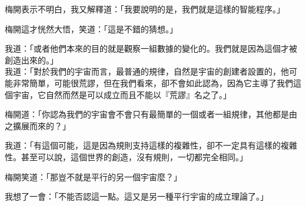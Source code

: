 梅開表示不明白，我又解釋道：「我要說明的是，我們就是這樣的智能程序。」

梅開這才恍然大悟，笑道：「這是不錯的猜想。」

我道：「或者他們本來的目的就是觀察一組數據的變化的。我們就是因為這個才被創造出來的。」
\\


我道：「對於我們的宇宙而言，最普通的規律，自然是宇宙的創建者設置的，他可能非常簡單，可能很荒謬，但在我們看來，卻不會如此認為，因為它主導了我們這個宇宙，它自然而然是可以成立而且不能以『荒謬』名之了。」

梅開道：「你認為我們的宇宙會不會只有最簡單的一個或者一組規律，其他都是由之擴展而來的？」

我道：「有這個可能，這是因為規則支持這樣的複雜性，卻不一定具有這樣的複雜性。甚至可以說，這個世界的創造，沒有規則，一切都完全相同。」

梅開笑道：「那豈不就是平行的另一個宇宙麼？」

我想了一會：「不能否認這一點。這又是另一種平行宇宙的成立理論了。」


